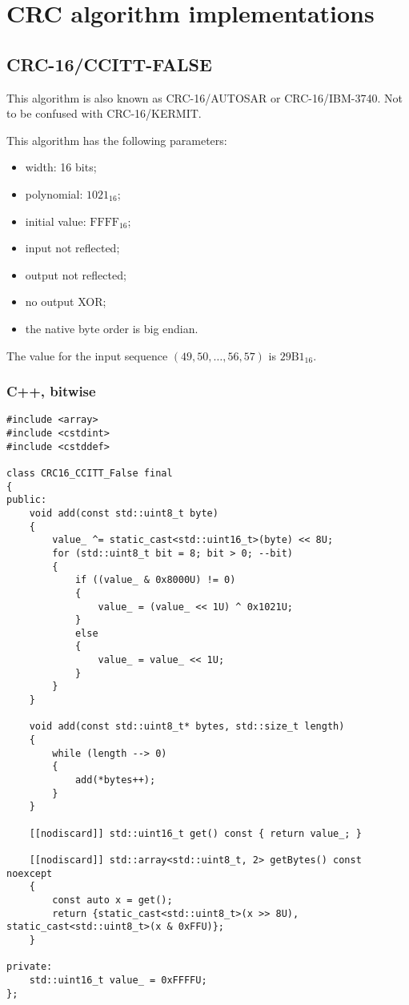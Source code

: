 \chapter{CRC algorithm implementations}

\section{CRC-16/CCITT-FALSE}\label{sec:appendix_crc16ccitt_false}

This algorithm is also known as CRC-16/AUTOSAR or CRC-16/IBM-3740.
Not to be confused with CRC-16/KERMIT.

This algorithm has the following parameters:
\begin{itemize}
    \item width: 16 bits;
    \item polynomial: $\mathrm{1021}_{16}$;
    \item initial value: $\mathrm{FFFF}_{16}$;
    \item input not reflected;
    \item output not reflected;
    \item no output XOR;
    \item the native byte order is big endian.
\end{itemize}

The value for the input sequence $\left(49, 50, \ldots, 56, 57\right)$ is $\mathrm{29B1}_{16}$.

\subsection{C++, bitwise}

\begin{samepage}
\begin{verbatim}
#include <array>
#include <cstdint>
#include <cstddef>

class CRC16_CCITT_False final
{
public:
    void add(const std::uint8_t byte)
    {
        value_ ^= static_cast<std::uint16_t>(byte) << 8U;
        for (std::uint8_t bit = 8; bit > 0; --bit)
        {
            if ((value_ & 0x8000U) != 0)
            {
                value_ = (value_ << 1U) ^ 0x1021U;
            }
            else
            {
                value_ = value_ << 1U;
            }
        }
    }

    void add(const std::uint8_t* bytes, std::size_t length)
    {
        while (length --> 0)
        {
            add(*bytes++);
        }
    }

    [[nodiscard]] std::uint16_t get() const { return value_; }

    [[nodiscard]] std::array<std::uint8_t, 2> getBytes() const noexcept
    {
        const auto x = get();
        return {static_cast<std::uint8_t>(x >> 8U), static_cast<std::uint8_t>(x & 0xFFU)};
    }

private:
    std::uint16_t value_ = 0xFFFFU;
};
\end{verbatim}
\end{samepage}

